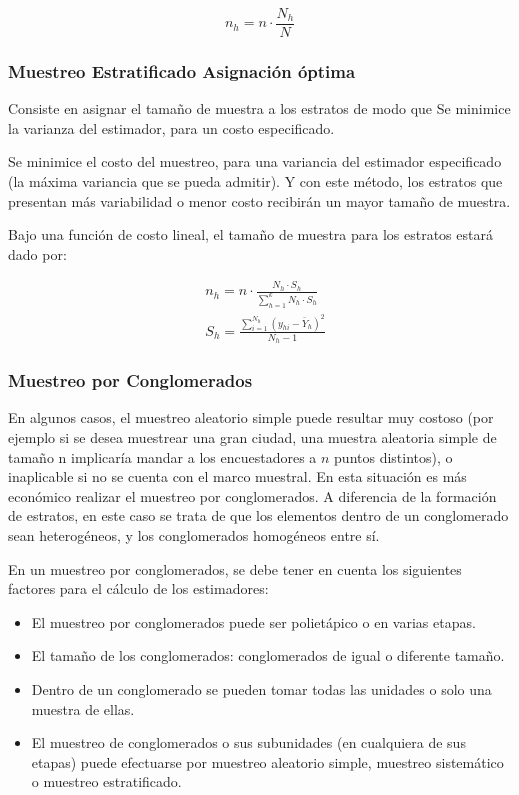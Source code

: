 \begin{equation}
    n_h=n\cdot\frac{N_h}{N}
\end{equation}


\subsubsection{Muestreo Estratificado Asignación óptima}

Consiste en asignar el tamaño de muestra a los
estratos de modo que Se minimice la varianza del estimador, para un
costo especificado.

Se minimice el costo del muestreo, para una
variancia del estimador especificado (la máxima
variancia que se pueda admitir). Y con este método, los estratos que presentan más
variabilidad o menor costo recibirán un mayor
tamaño de muestra.

Bajo una función de costo lineal, el tamaño de muestra para los estratos estará dado por:

\begin{align}
     & n_h=n\cdot\frac{N_h\cdot S_h}{\sum_{h=1}^k N_h\cdot S_h}          \\
     & S_h=\frac{\sum_{i=1}^{N_h}\left(y_{hi}-\bar{Y}_h\right)^2}{N_h-1}
\end{align}

\subsubsection{Muestreo por Conglomerados}

En algunos casos, el muestreo aleatorio simple puede resultar muy costoso (por ejemplo si se desea muestrear una gran ciudad, una muestra aleatoria simple de tamaño n implicaría mandar a los encuestadores a $n$ puntos distintos), o inaplicable si no se cuenta con el marco muestral. En esta situación es más económico realizar el muestreo por conglomerados. A diferencia de la formación de estratos, en este caso se trata de que los elementos dentro de un conglomerado sean heterogéneos, y los conglomerados homogéneos entre sí.

En un muestreo por conglomerados, se debe
tener en cuenta los siguientes factores para
el cálculo de los estimadores:

\begin{itemize}
    \item El muestreo por conglomerados puede ser polietápico o en varias etapas.
    \item El tamaño de los conglomerados: conglomerados de igual o diferente tamaño.
    \item Dentro de un conglomerado se pueden tomar todas las unidades o solo una muestra de ellas.
    \item El muestreo de conglomerados o sus subunidades (en cualquiera de sus etapas) puede efectuarse por muestreo aleatorio simple, muestreo sistemático o muestreo estratificado.
\end{itemize}


